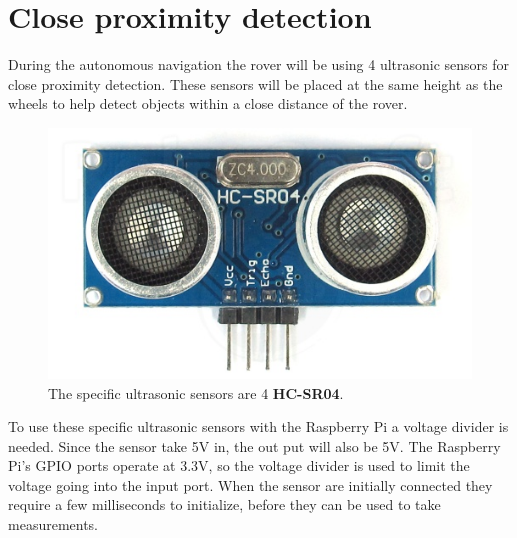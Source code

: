\clearpage
\section{Close proximity detection}

During the autonomous navigation the rover will be using 4 ultrasonic sensors for close proximity detection. These sensors will be placed at the same height as the wheels to help detect objects within a close distance of the rover.

\begin{figure}[H]
	\centering
	\includegraphics[width=.4\linewidth]{images/hcsr40.jpg}
	\caption{The specific ultrasonic sensors are 4 \textbf{HC-SR04}.}
	\label{fig:sub2}
\end{figure}

To use these specific ultrasonic sensors with the Raspberry Pi a voltage divider is needed. Since the sensor take 5V in, the out put will also be 5V. The Raspberry Pi's GPIO ports operate at 3.3V, so the voltage divider is used to limit the voltage going into the input port.
When the sensor are initially connected they require a few milliseconds to initialize, before they can be used to take measurements.

